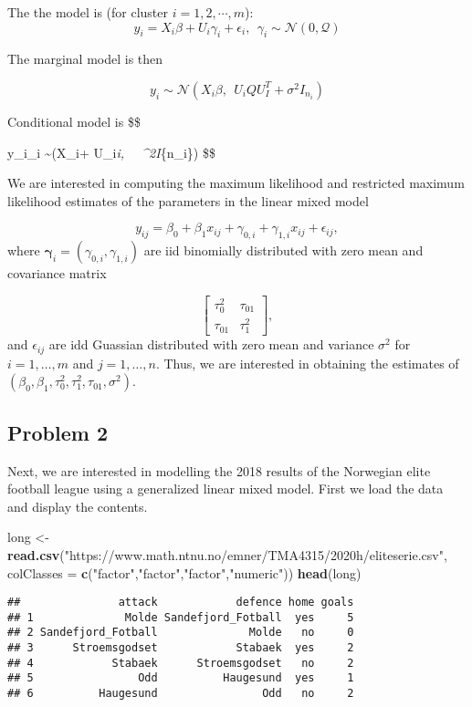 \documentclass[
]{article}
\newenvironment{Shaded}{\begin{snugshade}}{\end{snugshade}}
\newcommand{\DataTypeTok}[1]{\textcolor[rgb]{0.13,0.29,0.53}{#1}}
\newcommand{\KeywordTok}[1]{\textcolor[rgb]{0.13,0.29,0.53}{\textbf{#1}}}
\newcommand{\NormalTok}[1]{#1}
\newcommand{\StringTok}[1]{\textcolor[rgb]{0.31,0.60,0.02}{#1}}
\begin{document}
The the model is (for cluster \(i = 1, 2, \cdots, m\)): \[
y_i = X_i\beta + U_i\gamma_i + \epsilon_i, \ \ \gamma_i \sim \mathcal{N(0, Q)}
\]

The marginal model is then

\[
y_i \sim \mathcal{N}(X_i \beta,\ \  U_iQU_I^T + \sigma^2I_{n_i})
\]

Conditional model is \$\$

y\_i\textbar{}\gamma\_i \sim {}(X\_i\beta + U\_i\gamma\emph{i,
~~\sigma\^{}2I}\{n\_i\}) \$\$

We are interested in computing the maximum likelihood and restricted
maximum likelihood estimates of the parameters in the linear mixed model

\[
y_{ij} = \beta_0 + \beta_1x_{ij} + \gamma_{0,i} + \gamma_{1,i}x_{ij} + \epsilon_{ij},
\] where \(\boldsymbol{\gamma}_i = (\gamma_{0,i},\gamma_{1,i})\) are iid
binomially distributed with zero mean and covariance matrix

\[
\begin{bmatrix}
\tau_0^2 & \tau_{01} \\
\tau_{01} & \tau_{1}^2
\end{bmatrix},
\] and \(\epsilon_{ij}\) are idd Guassian distributed with zero mean and
variance \(\sigma^2\) for \(i = 1,\dots,m\) and \(j=1,\dots,n\). Thus,
we are interested in obtaining the estimates of
\((\beta_0,\beta_1,\tau_0^2,\tau_1^2,\tau_{01},\sigma^2)\).

\hypertarget{problem-2}{%
\subsection{Problem 2}\label{problem-2}}

Next, we are interested in modelling the 2018 results of the Norwegian
elite football league using a generalized linear mixed model. First we
load the data and display the contents.

\begin{Shaded}
\begin{Highlighting}[]
\NormalTok{long <-}\StringTok{ }\KeywordTok{read.csv}\NormalTok{(}\StringTok{"https://www.math.ntnu.no/emner/TMA4315/2020h/eliteserie.csv"}\NormalTok{, }\DataTypeTok{colClasses =} \KeywordTok{c}\NormalTok{(}\StringTok{"factor"}\NormalTok{,}\StringTok{"factor"}\NormalTok{,}\StringTok{"factor"}\NormalTok{,}\StringTok{"numeric"}\NormalTok{))}
\KeywordTok{head}\NormalTok{(long)}
\end{Highlighting}
\end{Shaded}

\begin{verbatim}
##               attack            defence home goals
## 1              Molde Sandefjord_Fotball  yes     5
## 2 Sandefjord_Fotball              Molde   no     0
## 3      Stroemsgodset            Stabaek  yes     2
## 4            Stabaek      Stroemsgodset   no     2
## 5                Odd          Haugesund  yes     1
## 6          Haugesund                Odd   no     2
\end{verbatim}
\end{document}
